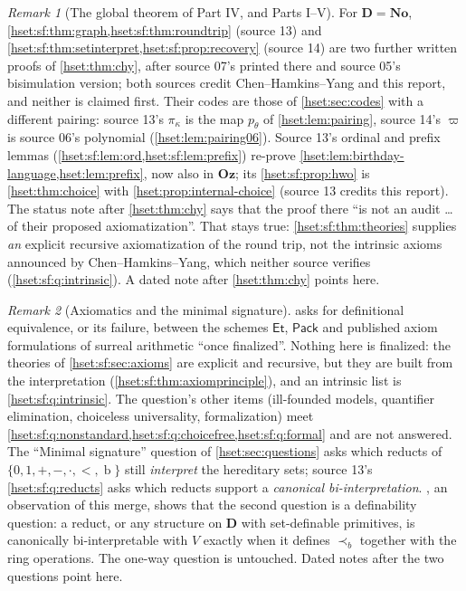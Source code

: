 \documentclass[11pt,letterpaper]{article}
\theoremstyle{definition}
\theoremstyle{remark}
\newtheorem{remark}[remark]{Remark}\aliascntresetthe{remark}
\newcommand{\No}{\mathbf{No}}
\newcommand{\bd}{\operatorname{b}}
\newcommand{\Et}{\mathsf{Et}}
\newcommand{\Pack}{\mathsf{Pack}}
\newcommand{\Oz}{\mathbf{Oz}}
\newcommand{\precb}{\prec_b}
\newcommand{\Dd}{\mathbf{D}}
\begin{document}
\begin{remark}[The global theorem of Part IV, and Parts I--V]
\label{hset:sf:rem:chy}
For $\Dd=\No$, \cref{hset:sf:thm:graph,hset:sf:thm:roundtrip} (source 13) and
\cref{hset:sf:thm:setinterpret,hset:sf:prop:recovery} (source 14) are two further
written proofs of \cref{hset:thm:chy}, after source 07's printed there and source
05's bisimulation version; both sources credit Chen--Hamkins--Yang and this
report, and neither is claimed first. Their codes are those of
\cref{hset:sec:codes} with a different pairing: source 13's $\pi_\kappa$ is the
map $p_\theta$ of \cref{hset:lem:pairing}, source 14's $\varpi$ is source 06's
polynomial (\cref{hset:lem:pairing06}). Source 13's ordinal and prefix lemmas
(\cref{hset:sf:lem:ord,hset:sf:lem:prefix}) re-prove
\cref{hset:lem:birthday-language,hset:lem:prefix}, now also in $\Oz$; its
\cref{hset:sf:prop:hwo} is \cref{hset:thm:choice} with
\cref{hset:prop:internal-choice} (source 13 credits this report). The status note
after \cref{hset:thm:chy} says that the proof there ``is not an audit \dots{} of
their proposed axiomatization''. That stays true: \cref{hset:sf:thm:theories}
supplies \emph{an} explicit recursive axiomatization of the round trip, not the
intrinsic axioms announced by Chen--Hamkins--Yang, which neither source verifies
(\cref{hset:sf:q:intrinsic}). A dated note after \cref{hset:thm:chy} points
here.
\end{remark}

\begin{remark}[Axiomatics and the minimal signature]
\label{hset:sf:rem:axiomatics}
 asks for definitional equivalence, or its failure,
between the schemes $\Et$, $\Pack$ and published axiom formulations of surreal
arithmetic ``once finalized''. Nothing here is finalized: the theories of
\cref{hset:sf:sec:axioms} are explicit and recursive, but they are built from the
interpretation (\cref{hset:sf:thm:axiomprinciple}), and an intrinsic list is
\cref{hset:sf:q:intrinsic}. The question's other items (ill-founded models,
quantifier elimination, choiceless universality, formalization) meet
\cref{hset:sf:q:nonstandard,hset:sf:q:choicefree,hset:sf:q:formal} and are not
answered. The ``Minimal signature'' question of \cref{hset:sec:questions} asks
which reducts of $\{0,1,+,-,\cdot,<,\bd\}$ still \emph{interpret} the hereditary
sets; source 13's \cref{hset:sf:q:reducts} asks which reducts support a
\emph{canonical bi-interpretation}. , an observation
of this merge, shows that the second question is a definability question: a
reduct, or any structure on $\Dd$ with set-definable primitives, is canonically
bi-interpretable with $V$ exactly when it defines $\precb$ together with the ring
operations. The one-way question is untouched. Dated notes after the two
questions point here.
\end{remark}
\end{document}
